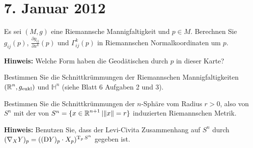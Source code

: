 
\section{7. Januar 2012}
\setcounter{Aufg}{0} %
\setcounter{Loes}{0}

\begin{Aufg}
Es sei $(M,g)$ eine Riemannsche Mannigfaltigkeit und $p\in M$. Berechnen Sie $g_{ij}(p)$, $\frac{\partial g_{ij}}{\partial x^k}(p)$  und $\Gamma_{ij}^k(p)$ in Riemannschen Normalkoordinaten um $p$.

{\footnotesize \textbf{Hinweis:} Welche Form haben die Geodätischen durch $p$ in dieser Karte?}
\end{Aufg}

\begin{Aufg}
Bestimmen Sie die Schnittkrümmungen der Riemannschen Mannigfaltigkeiten $(\operatorname{\mathbb{R}}^n,g_{\mathrm{eukl}})$ und $\mathbb{H}^n$ (siehe Blatt 6 Aufgaben 2 und 3).
\end{Aufg}

\begin{Aufg}
Bestimmen Sie die Schnittkrümmungen der $n$-Sphäre vom Radius $r>0$, also von $S^n$ mit der von $S^n=\{x \in \operatorname{\mathbb{R}}^{n+1} | \|x\|=r\}$ induzierten Riemannschen Metrik.

{\footnotesize \textbf{Hinweis:} Benutzen Sie, dass der Levi-Civita Zusammenhang auf $S^n$  durch $(\nabla_X Y)_p=((\mathrm{D} Y)_p \cdot X_p)^{\operatorname{T}_p S^n}$ gegeben ist.}
\end{Aufg}

